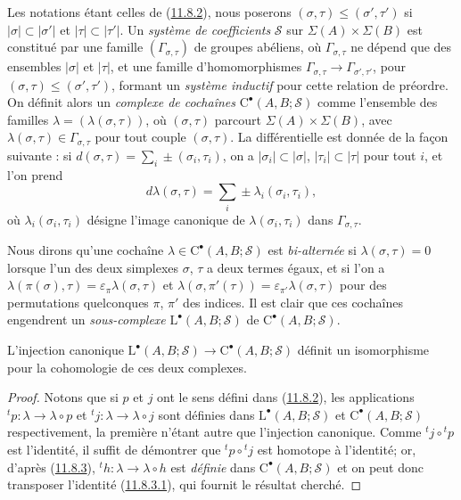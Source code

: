 \begin{env}[11.8.4]
\label{0.11.8.4-fr}
Les notations étant celles de (\hyperref[0.11.8.2-fr]{11.8.2}), nous poserons
$(\sigma,\tau)\leq(\sigma',\tau')$ si $|\sigma|\subset|\sigma'|$ et
$|\tau|\subset|\tau'|$. Un \emph{système de coefficients} $\mathscr S$ sur
$\Sigma(A)\times\Sigma(B)$ est constitué par une famille
$(\Gamma_{\sigma,\tau})$ de groupes abéliens, où
$\Gamma_{\sigma,\tau}$ ne dépend que des ensembles $|\sigma|$ et $|\tau|$,
et une famille d'homomorphismes
$\Gamma_{\sigma,\tau}\longrightarrow\Gamma_{\sigma',\tau'}$, pour $(\sigma,\tau)\leq(\sigma',\tau')$,
formant un \emph{système inductif} pour cette relation de préordre. On définit alors
un \emph{complexe de cochaînes} $\mathrm C^\bullet(A,B;\mathscr S)$ comme l'ensemble
des familles $\lambda=(\lambda(\sigma,\tau))$, où $(\sigma,\tau)$ parcourt
$\Sigma(A)\times\Sigma(B)$, avec
$\lambda(\sigma,\tau)\in\Gamma_{\sigma,\tau}$ pour tout couple
$(\sigma,\tau)$. La différentielle est donnée de la façon suivante : si
$d(\sigma,\tau)=\sum_i\pm(\sigma_i,\tau_i)$,
on a $|\sigma_i|\subset|\sigma|$, $|\tau_i|\subset|\tau|$ pour tout $i$, et
l'on prend
\[
d\lambda(\sigma,\tau)=\sum_i\pm\lambda_i(\sigma_i,\tau_i),
\]
où $\lambda_i(\sigma_i,\tau_i)$ désigne l'image canonique de
$\lambda(\sigma_i,\tau_i)$ dans $\Gamma_{\sigma,\tau}$.

Nous dirons qu'une cochaîne $\lambda\in\mathrm C^\bullet(A,B;\mathscr S)$ est
\emph{bi-alternée} si $\lambda(\sigma,\tau)=0$ lorsque l'un des deux
simplexes $\sigma$, $\tau$ a deux termes égaux, et si l'on a
$\lambda(\pi(\sigma),\tau)=\varepsilon_\pi\lambda(\sigma,\tau)$ et
$\lambda(\sigma,\pi'(\tau))=\varepsilon_{\pi'}\lambda(\sigma,\tau)$
pour des permutations quelconques $\pi$, $\pi'$ des indices. Il est clair
que ces cochaînes engendrent un \emph{sous-complexe}
$\mathrm L^\bullet(A,B;\mathscr S)$ de $\mathrm C^\bullet(A,B;\mathscr S)$.
\end{env}

\begin{proposition}[11.8.5]
\label{0.11.8.5-fr}
{L'injection canonique
$\mathrm L^\bullet(A,B;\mathscr S)\longrightarrow\mathrm C^\bullet(A,B;\mathscr S)$
définit un isomorphisme pour la cohomologie de ces deux complexes.}
\end{proposition}

\begin{proof}
Notons que si $p$ et $j$ ont le sens défini dans
(\hyperref[0.11.8.2-fr]{11.8.2}), les applications
${}^tp:\lambda\to\lambda\circ p$ et
${}^tj:\lambda\to\lambda\circ j$
sont définies dans $\mathrm L^\bullet(A,B;\mathscr S)$ et
$\mathrm C^\bullet(A,B;\mathscr S)$ respectivement, la première n'étant autre
que l'injection canonique. Comme ${}^tj\circ{}^tp$ est l'identité, il
suffit de démontrer que ${}^tp\circ{}^tj$ est homotope à l'identité; or,
d'après (\hyperref[0.11.8.3-fr]{11.8.3}),
${}^th:\lambda\to\lambda\circ h$ est \emph{définie} dans
$\mathrm C^\bullet(A,B;\mathscr S)$ et on peut donc transposer l'identité
(\hyperref[0.11.8.3.1-fr]{11.8.3.1}), qui fournit le résultat cherché.
\end{proof}

